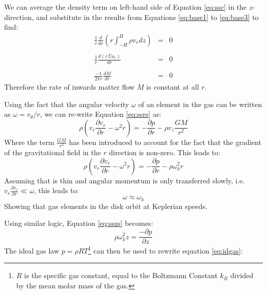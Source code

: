 We can average the density term on left-hand side of Equation \ref{eq:ssc} in the $z$-direction, and substitute in the results from Equations \ref{eq:base1} to \ref{eq:base3} to find:
\begin{eqnarray}
\frac{1}{r}\frac{d}{dr}\left(r\int_{-H}^H\rho v_rdz\right)&=&0\\\nonumber\\
\frac{1}{r}\frac{d(r\Sigma u_r)}{dr}&=&0\\\nonumber\\
\frac{-1}{2\pi r}\frac{d\dot{M}}{dr}&=&0
\end{eqnarray}
Therefore the rate of inwards matter flow $\dot{M}$ is constant at all $r$.
\par Using the fact that the angular velocity $\omega$ of an element in the gas can be written as $\omega=v_\theta/r$, we can re-write Equation \ref{eq:ssrs} as:
\begin{equation}
\rho\left(v_r\frac{\partial v_r}{\partial r}-\omega^2r\right)=-\frac{\partial p}{\partial r}-\rho v_z\frac{GM}{r^2}
\end{equation}
Where the term $\frac{GM}{r^2}$ has been introduced to account for the fact that the gradient of the gravitational field in the $r$ direction is non-zero.  This leads to:
\begin{equation}
\rho\left(v_r\frac{\partial v_r}{\partial r}-\omega^2r\right)=-\frac{\partial p}{\partial r}-\rho\omega_k^2r
\end{equation}
Assuming that is thin and angular momentum is only transferred slowly, i.e. $v_r\frac{\partial v_r}{\partial r}\ll\omega$, this leads to:
\begin{equation}
\omega\approx\omega_k
\end{equation}
Showing that gas elements in the disk orbit at Keplerian speeds.
\par Using similar logic, Equation \ref{eq:sszs} becomes:
\begin{equation}
\rho\omega_k^2 z=\frac{-\partial p}{\partial z}\label{eq:idgas}
\end{equation}
The ideal gas law $p=\rho RT$\footnote{$R$ is the specific gas constant, equal to the Boltzmann Constant $k_B$ divided by the mean molar mass of the gas.} can then be used to rewrite equation \ref{eq:idgas}:
